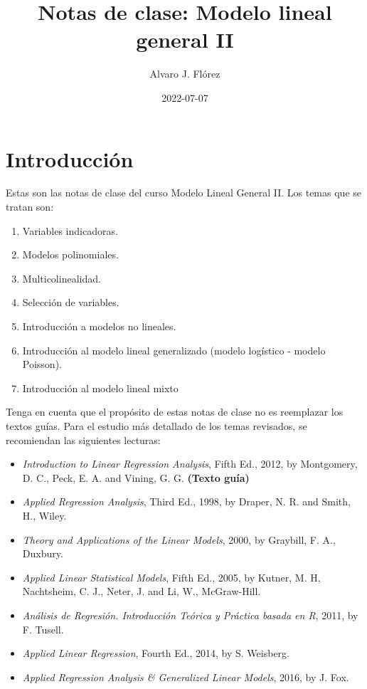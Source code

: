 \documentclass[
]{article}
\title{Notas de clase: Modelo lineal general II}
\author{Alvaro J. Flórez}
\date{2022-07-07}
\providecommand{\tightlist}{%
  \setlength{\itemsep}{0pt}\setlength{\parskip}{0pt}}
\begin{document}
\maketitle

{
\setcounter{tocdepth}{2}
\tableofcontents
}
\hypertarget{introducciuxf3n}{%
\section*{Introducción}\label{introducciuxf3n}}

Estas son las notas de clase del curso Modelo Lineal General II. Los temas que se tratan son:

\begin{enumerate}
\def\labelenumi{\arabic{enumi}.}
\tightlist
\item
  Variables indicadoras.
\item
  Modelos polinomiales.
\item
  Multicolinealidad.
\item
  Selección de variables.
\item
  Introducción a modelos no lineales.
\item
  Introducción al modelo lineal generalizado (modelo logístico - modelo Poisson).
\item
  Introducción al modelo lineal mixto
\end{enumerate}

Tenga en cuenta que el propósito de estas notas de clase no es reemplazar los textos guías. Para el estudio más detallado de los temas revisados, se recomiendan las siguientes lecturas:

\begin{itemize}
\tightlist
\item
  \emph{Introduction to Linear Regression Analysis}, Fifth Ed., 2012, by Montgomery, D. C., Peck, E. A. and Vining, G. G. \textbf{(Texto guía)}
\item
  \emph{Applied Regression Analysis}, Third Ed., 1998, by Draper, N. R. and Smith, H., Wiley.
\item
  \emph{Theory and Applications of the Linear Models}, 2000, by Graybill, F. A., Duxbury.
\item
  \emph{Applied Linear Statistical Models}, Fifth Ed., 2005, by Kutner, M. H, Nachtsheim, C. J., Neter, J. and Li, W., McGraw-Hill.
\item
  \emph{Análisis de Regresión. Introducción Teórica y Práctica basada en R}, 2011, by F. Tusell.
\item
  \emph{Applied Linear Regression}, Fourth Ed., 2014, by S. Weisberg.
\item
  \emph{Applied Regression Analysis \& Generalized Linear Models}, 2016, by J. Fox.
\end{itemize}
\end{document}
